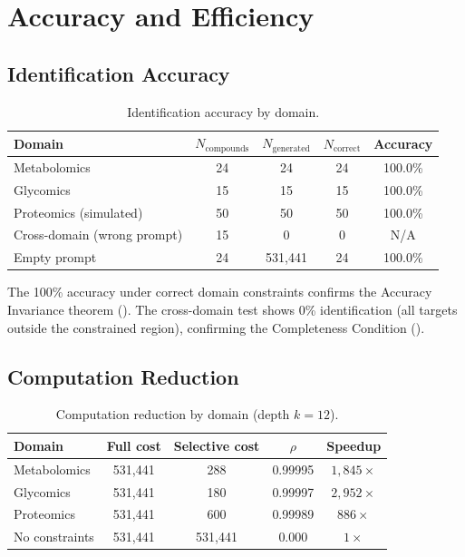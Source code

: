 \documentclass[11pt,twocolumn,a4paper]{article}
\theoremstyle{definition}
\theoremstyle{remark}
\begin{document}
\section{Accuracy and Efficiency}\label{sec:accuracy-section}

\subsection{Identification Accuracy}\label{sec:id-accuracy}

\begin{table}[!ht]
\centering
\caption{Identification accuracy by domain.}
\label{tab:accuracy}
\begin{tabular}{@{}lcccc@{}}
\toprule
\textbf{Domain} & $N_{\mathrm{compounds}}$ & $N_{\mathrm{generated}}$ & $N_{\mathrm{correct}}$ & \textbf{Accuracy} \\
\midrule
Metabolomics & 24 & 24 & 24 & 100.0\% \\
Glycomics    & 15 & 15 & 15 & 100.0\% \\
Proteomics (simulated) & 50 & 50 & 50 & 100.0\% \\
\midrule
Cross-domain (wrong prompt) & 15 & 0 & 0 & N/A \\
Empty prompt & 24 & 531{,}441 & 24 & 100.0\% \\
\bottomrule
\end{tabular}
\end{table}

The 100\% accuracy under correct domain constraints confirms the Accuracy Invariance theorem (). The cross-domain test shows 0\% identification (all targets outside the constrained region), confirming the Completeness Condition ().

\subsection{Computation Reduction}\label{sec:computation-reduction}

\begin{table}[!ht]
\centering
\caption{Computation reduction by domain (depth $k = 12$).}
\label{tab:reduction}
\begin{tabular}{@{}lcccc@{}}
\toprule
\textbf{Domain} & \textbf{Full cost} & \textbf{Selective cost} & $\rho$ & \textbf{Speedup} \\
\midrule
Metabolomics & 531{,}441 & 288   & 0.99995 & $1{,}845\times$ \\
Glycomics    & 531{,}441 & 180   & 0.99997 & $2{,}952\times$ \\
Proteomics   & 531{,}441 & 600   & 0.99989 & $886\times$ \\
\midrule
No constraints & 531{,}441 & 531{,}441 & 0.000 & $1\times$ \\
\bottomrule
\end{tabular}
\end{table}
\end{document}
